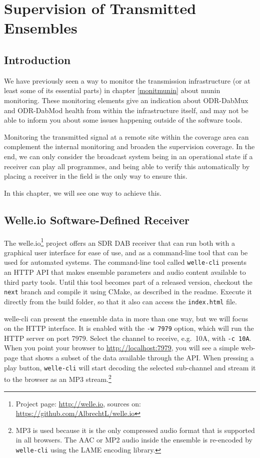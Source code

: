 \section{Supervision of Transmitted Ensembles}
\subsection{Introduction} 
We have previously seen a way to monitor the transmission infrastructure (or at
least some of its essential parts) in chapter \ref{monitmunin} about munin 
monitoring. These monitoring elements give an indication about ODR-DabMux and
ODR-DabMod health from within the infrastructure itself, and may not be able to
inform you about some issues happening outside of the software tools.

Monitoring the transmitted signal at a remote site within the coverage area can
complement the internal monitoring and broaden the supervision coverage. In the
end, we can only consider the broadcast system being in an operational state if
a receiver can play all programmes, and being able to verify this automatically
by placing a receiver in the field is the only way to ensure this.

In this chapter, we will see one way to achieve this.

\subsection{Welle.io Software-Defined Receiver}
The welle.io\footnote{Project page: \url{http://welle.io}, sources on:
\url{https://github.com/AlbrechtL/welle.io}} project offers an SDR DAB receiver
that can run both with a graphical user interface for ease of use, and as a
command-line tool that can be used for automated systems.
The command-line tool called \texttt{welle-cli} presents an HTTP API that makes
ensemble parameters and audio content available to third party tools. Until this
tool becomes part of a released version, checkout the \texttt{next} branch and
compile it using CMake, as described in the readme. Execute it directly from the
build folder, so that it also can access the \texttt{index.html} file.

welle-cli can present the ensemble data in more than one way, but we will focus
on the HTTP interface. It is enabled with the \texttt{-w 7979} option, which
will run the HTTP server on port 7979. Select the channel to receive, e.g.~10A, with
\texttt{-c 10A}.
When you point your browser to \url{http://localhost:7979}, you will see a
simple web-page that shows a subset of the data available through the API. When
pressing a play button, \texttt{welle-cli} will start decoding the selected
sub-channel and stream it to the browser as an MP3 stream.\footnote{MP3 is used
because it is the only compressed audio format that is supported in all
browsers. The AAC or MP2 audio inside the ensemble is re-encoded by
\texttt{welle-cli} using the LAME encoding library.}

